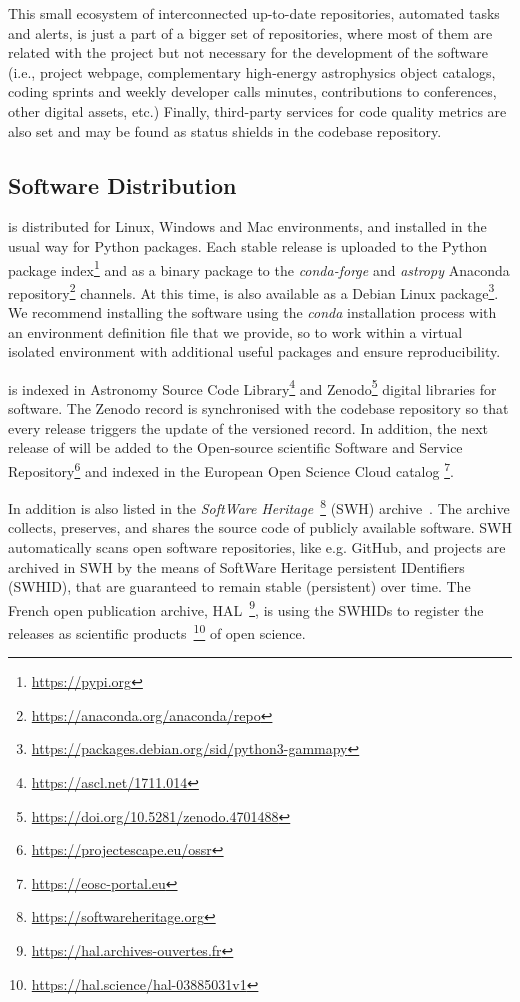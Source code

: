 \documentclass[traditabstract, longauth]{aa}
\begin{document}
This small ecosystem of interconnected up-to-date repositories, automated tasks
and alerts, is just a part of a bigger set of \github repositories, where most
of them are related with the project but not necessary for the development of
the software (i.e., project webpage, complementary high-energy astrophysics
object catalogs, coding sprints and weekly developer calls minutes,
contributions to conferences, other digital assets, etc.) Finally, third-party
services for code quality metrics are also set and may be found as status
shields in the codebase repository.

\subsection{Software Distribution}
\label{ssec:software-distribution}

\gammapy is distributed for Linux, Windows and Mac environments, and installed
in the usual way for Python packages. Each stable release is uploaded to the
Python package index\footnote{\url{https://pypi.org}} and as a binary package
to the \textit{conda-forge} and \textit{astropy} Anaconda
repository\footnote{\url{https://anaconda.org/anaconda/repo}} channels. At this
time, \gammapy is also available as a Debian Linux
package\footnote{\url{https://packages.debian.org/sid/python3-gammapy}}. We
recommend installing the software using the \textit{conda} installation process
with an environment definition file that we provide, so to work within a
virtual isolated environment with additional useful packages and ensure
reproducibility.

\gammapy is indexed in Astronomy Source Code
Library\footnote{\url{https://ascl.net/1711.014}} and
Zenodo\footnote{\url{https://doi.org/10.5281/zenodo.4701488}} digital libraries for
software. The Zenodo record is synchronised with the codebase \github repository
so that every release triggers the update of the versioned record. In addition,
the next release of \gammapy will be added to the Open-source scientific
Software and Service Repository\footnote{\url{https://projectescape.eu/ossr}}
and indexed in the European Open Science Cloud
catalog \footnote{\url{https://eosc-portal.eu}}.

In addition \gammapy is also listed in the \textit{SoftWare
Heritage}~\footnote{\url{https://softwareheritage.org}} (SWH) archive~\cite{DiCosmo2020}.
The archive collects, preserves, and shares the source code of publicly available software.
SWH automatically scans open software repositories, like e.g. GitHub, and projects are archived in SWH by the
means of SoftWare Heritage persistent IDentifiers (SWHID), that are guaranteed to remain stable (persistent)
over time. The French open publication archive, HAL~\footnote{\url{https://hal.archives-ouvertes.fr}},
is using the \gammapy SWHIDs to register the releases as scientific
products~\footnote{\url{https://hal.science/hal-03885031v1}} of open science.
\end{document}
